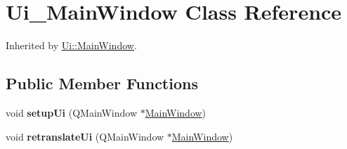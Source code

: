 \hypertarget{class_ui___main_window}{
\section{Ui\_\-MainWindow Class Reference}
\label{class_ui___main_window}
}


Inherited by \hyperlink{class_ui_1_1_main_window}{Ui::MainWindow}.\subsection*{Public Member Functions}
\begin{DoxyCompactItemize}
\item 
\hypertarget{class_ui___main_window_acf4a0872c4c77d8f43a2ec66ed849b58}{
void {\bfseries setupUi} (QMainWindow $\ast$\hyperlink{class_main_window}{MainWindow})}
\label{class_ui___main_window_acf4a0872c4c77d8f43a2ec66ed849b58}

\item 
\hypertarget{class_ui___main_window_a097dd160c3534a204904cb374412c618}{
void {\bfseries retranslateUi} (QMainWindow $\ast$\hyperlink{class_main_window}{MainWindow})}
\label{class_ui___main_window_a097dd160c3534a204904cb374412c618}

\end{DoxyCompactItemize}
